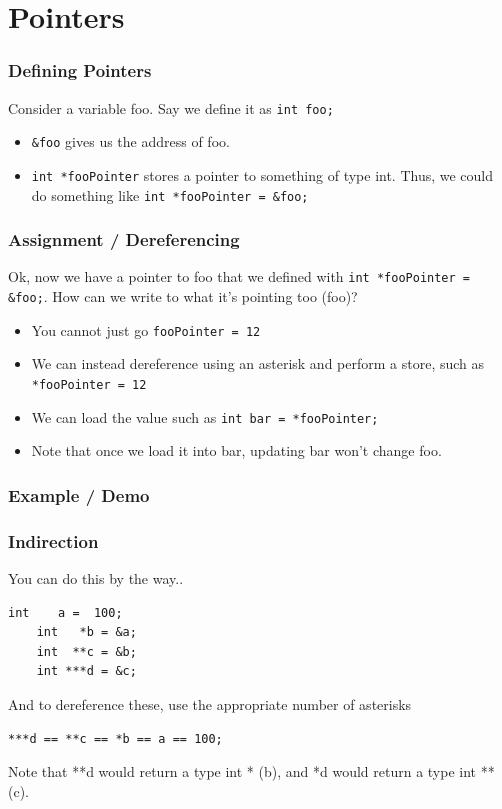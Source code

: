 \documentclass{beamer}
\begin{document}
\section{Pointers}
\begin{frame}
  \frametitle{Defining Pointers}
  Consider a variable foo. Say we define it as \texttt{int foo;}
  \begin{itemize}
    \item \texttt{\&foo} gives us the address of foo.
    \item \texttt{int *fooPointer} stores a pointer to something of type int. Thus, we could do something like \texttt{int *fooPointer = \&foo;}
  \end{itemize}
\end{frame}
\begin{frame}
  \frametitle{Assignment / Dereferencing}
  Ok, now we have a pointer to foo that we defined with \texttt{int *fooPointer = \&foo;}. How can we write to what it's pointing too (foo)?
  \begin{itemize}
    \item You cannot just go \texttt{fooPointer = 12}
    \item We can instead dereference using an asterisk and perform a store, such as \texttt{*fooPointer = 12}
    \item We can load the value such as \texttt{int bar = *fooPointer;}
    \item Note that once we load it into bar, updating bar won't change foo.
  \end{itemize}
\end{frame}
\begin{frame}
  \frametitle{Example / Demo}
  
\end{frame}
\begin{frame}[fragile]
  \frametitle{Indirection}
  You can do this by the way..
  \begin{lstlisting}[style=customc]
    int    a =  100;
    int   *b = &a;
    int  **c = &b;
    int ***d = &c;
  \end{lstlisting}
  And to dereference these, use the appropriate number of asterisks
  \begin{lstlisting}[style=customc]
    ***d == **c == *b == a == 100;
  \end{lstlisting}
  Note that **d would return a type int * (b), and *d would return a type int ** (c).
\end{frame}
\end{document}
